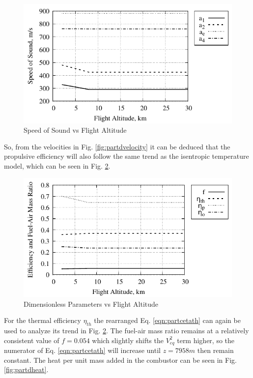 \documentclass[conf]{new-aiaa} %
\begin{document}
\begin{figure}[H] %
    \centering
    \includegraphics[]{media/performance_parameter_files/part_d_speed_of_sound.pdf}
    \caption{\label{fig:partdspeedofsound}Speed of Sound vs Flight Altitude}
\end{figure}

So, from the velocities in Fig. \ref{fig:partdvelocity} it can be deduced that the propulsive efficiency will also follow the same trend as the isentropic temperature model, which can be seen in Fig. \ref{fig:partddimless}.

\begin{figure}[H] %
    \centering
    \includegraphics[]{media/performance_parameter_files/part_d_dimless.pdf}
    \caption{\label{fig:partddimless}Dimensionless Parameters vs Flight Altitude}
\end{figure}
For the thermal efficiency $\eta_{th}$ the rearranged Eq. \ref{eqn:partcetath} can again be used to analyze its trend in Fig. \ref{fig:partddimless}. The fuel-air mass ratio remains at a relatively consistent value of $f=0.054$ which slightly shifts the $V_{eq}^2$ term higher, so the numerator of Eq. \ref{eqn:partcetath} will increase until $z=7958m$ then remain constant. The heat per unit mass added in the combustor can be seen in Fig. \ref{fig:partdheat}.
\end{document}
